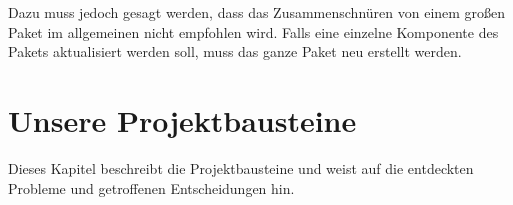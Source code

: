 Dazu muss jedoch gesagt werden, dass das Zusammenschnüren von einem großen Paket im allgemeinen nicht empfohlen wird.
Falls eine einzelne Komponente des Pakets aktualisiert werden soll, muss das ganze Paket neu erstellt werden. 

\section{Unsere Projektbausteine}
\label{sec:projektbausteine}
Dieses Kapitel beschreibt die Projektbausteine und weist auf die entdeckten Probleme und getroffenen Entscheidungen hin.
